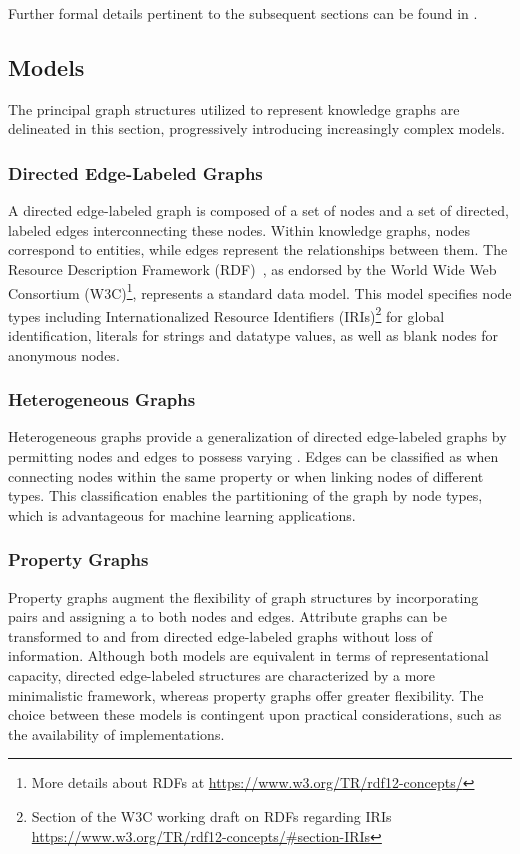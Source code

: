Further formal details pertinent to the subsequent sections can be found in .

\subsection{Models}\label{models}
The principal graph structures utilized to represent knowledge graphs are delineated in this section, progressively introducing increasingly complex models.

\subsubsection{Directed Edge-Labeled Graphs}\label{models:directed_edge_labeled_graphs}
A directed edge-labeled graph is composed of a set of nodes and a set of directed, labeled edges interconnecting these nodes. Within knowledge graphs, nodes correspond to entities, while edges represent the relationships between them. The Resource Description Framework (RDF)~\cite{Cyganiak2014rdf}, as endorsed by the World Wide Web Consortium (W3C)\footnote{More details about RDFs at \url{https://www.w3.org/TR/rdf12-concepts/}}, represents a standard data model. This model specifies node types including Internationalized Resource Identifiers (IRIs)\footnote{Section of the W3C working draft on RDFs regarding IRIs \url{https://www.w3.org/TR/rdf12-concepts/\#section-IRIs}} for global identification, literals for strings and datatype values, as well as blank nodes for anonymous nodes.

\subsubsection{Heterogeneous Graphs}
Heterogeneous graphs provide a generalization of directed edge-labeled graphs by permitting nodes and edges to possess varying . Edges can be classified as  when connecting nodes within the same property or  when linking nodes of different types. This classification enables the partitioning of the graph by node types, which is advantageous for machine learning applications.

\subsubsection{Property Graphs}
Property graphs augment the flexibility of graph structures by incorporating  pairs and assigning a  to both nodes and edges. Attribute graphs can be transformed to and from directed edge-labeled graphs without loss of information. Although both models are equivalent in terms of representational capacity, directed edge-labeled structures are characterized by a more minimalistic framework, whereas property graphs offer greater flexibility. The choice between these models is contingent upon practical considerations, such as the availability of implementations.

